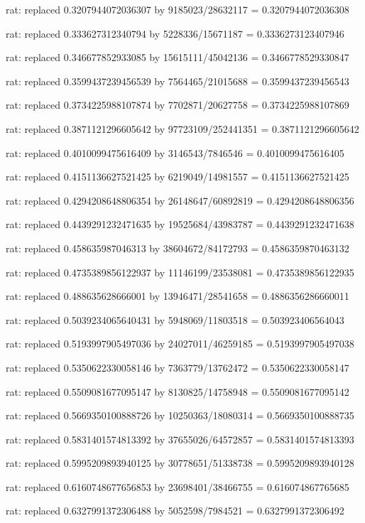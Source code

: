 \documentclass[a4paper,10pt]{article}
\begin{document}
\begin{eulernotebook}
\begin{eulercomment}
\begin{eulercomment}
\begin{eulercomment}
\begin{eulercomment}
\begin{eulercomment}
\begin{eulercomment}
\begin{eulercomment}
\begin{eulercomment}
\begin{eulercomment}
\begin{eulercomment}
\begin{eulercomment}
\begin{eulercomment}
\begin{eulercomment}
\begin{eulercomment}
\begin{eulercomment}
\begin{eulercomment}
\begin{euleroutput}
  rat: replaced 0.3207944072036307 by 9185023/28632117 = 0.3207944072036308
  
  rat: replaced 0.333627312340794 by 5228336/15671187 = 0.3336273123407946
  
  rat: replaced 0.346677852933085 by 15615111/45042136 = 0.3466778529330847
  
  rat: replaced 0.3599437239456539 by 7564465/21015688 = 0.3599437239456543
  
  rat: replaced 0.3734225988107874 by 7702871/20627758 = 0.3734225988107869
  
  rat: replaced 0.3871121296605642 by 97723109/252441351 = 0.3871121296605642
  
  rat: replaced 0.4010099475616409 by 3146543/7846546 = 0.4010099475616405
  
  rat: replaced 0.4151136627521425 by 6219049/14981557 = 0.4151136627521425
  
  rat: replaced 0.4294208648806354 by 26148647/60892819 = 0.4294208648806356
  
  rat: replaced 0.4439291232471635 by 19525684/43983787 = 0.4439291232471638
  
  rat: replaced 0.458635987046313 by 38604672/84172793 = 0.4586359870463132
  
  rat: replaced 0.4735389856122937 by 11146199/23538081 = 0.4735389856122935
  
  rat: replaced 0.488635628666001 by 13946471/28541658 = 0.4886356286660011
  
  rat: replaced 0.5039234065640431 by 5948069/11803518 = 0.503923406564043
  
  rat: replaced 0.5193997905497036 by 24027011/46259185 = 0.5193997905497038
  
  rat: replaced 0.5350622330058146 by 7363779/13762472 = 0.5350622330058147
  
  rat: replaced 0.5509081677095147 by 8130825/14758948 = 0.5509081677095142
  
  rat: replaced 0.5669350100888726 by 10250363/18080314 = 0.5669350100888735
  
  rat: replaced 0.5831401574813392 by 37655026/64572857 = 0.5831401574813393
  
  rat: replaced 0.5995209893940125 by 30778651/51338738 = 0.5995209893940128
  
  rat: replaced 0.6160748677656853 by 23698401/38466755 = 0.616074867765685
  
  rat: replaced 0.6327991372306488 by 5052598/7984521 = 0.6327991372306492
  

\end{euleroutput}
\end{eulercomment}
\end{eulercomment}
\end{eulercomment}
\end{eulercomment}
\end{eulercomment}
\end{eulercomment}
\end{eulercomment}
\end{eulercomment}
\end{eulercomment}
\end{eulercomment}
\end{eulercomment}
\end{eulercomment}
\end{eulercomment}
\end{eulercomment}
\end{eulercomment}
\end{eulercomment}
\end{eulernotebook}
\end{document}
